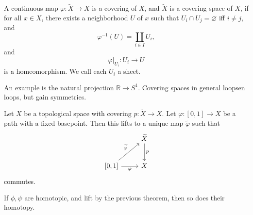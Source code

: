 \begin{definition}\label{dfn:laalal}
	A continuous map $\varphi : \widetilde{X}  \to X$ is a covering of $X$, and $\widetilde{X} $ is a covering space of $X$, if for all $x\in X$, there exists a neighborhood $U$ of $x$ such that $U_i \cap U_j=\varnothing $ iff $i\neq j$, and
	\[
		\varphi ^{-1} (U)=\coprod_{i\in I}U_i,
	\]
	and
	\[
		\varphi|_{U_i} : U_i \to U
	\]
	is a homeomorphism. We call each $U_i$ a sheet.
\end{definition}

An example is the natural projection $\mathbb{R} \to S^1$. Covering spaces in general loopsen loops, but gain symmetries.

\begin{lemma}\label{lma:aaaa}
	Let $X$ be a topological space with covering $p : \widetilde{X}  \to X$. Let $\varphi : [0,1] \to X$ be a path with a fixed basepoint. Then this lifts to a unique map $\widetilde{\varphi } $ such that
	\[\begin{tikzcd}[row sep = 2.5em, column sep = 2.5em]
	 & \widetilde{X} \ar[" p ", d]  \\
	\left[ 0,1 \right]\ar[" \varphi  "', r] \ar[" \widetilde{\varphi }  ", ur]  & X
	\end{tikzcd}\]
	commutes.
\end{lemma}
\begin{lemma}\label{lma:hlifting}
	If $\phi ,\psi $ are homotopic, and lift by the previous theorem, then so does their homotopy.
\end{lemma}

